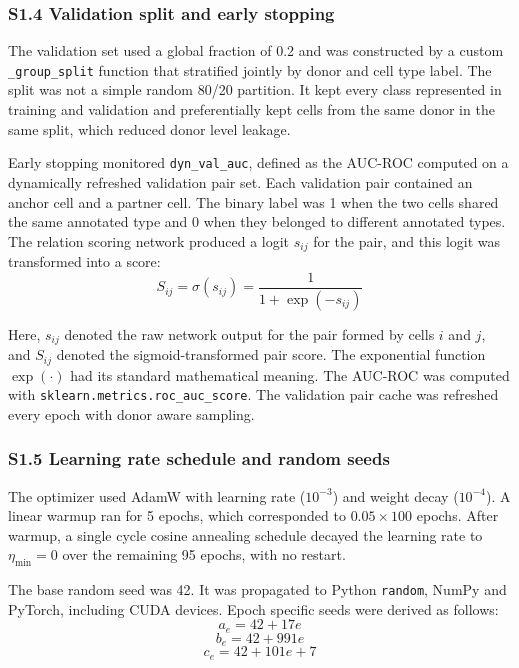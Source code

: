 \documentclass[11pt]{article}
\begin{document}
\subsubsection*{S1.4 Validation split and early stopping}

The validation set used a global fraction of 0.2 and was constructed by a custom \texttt{\_group\_split} function that stratified jointly by donor and cell type label. The split was not a simple random 80/20 partition. It kept every class represented in training and validation and preferentially kept cells from the same donor in the same split, which reduced donor level leakage.

Early stopping monitored \texttt{dyn\_val\_auc}, defined as the AUC-ROC computed on a dynamically refreshed validation pair set. Each validation pair contained an anchor cell and a partner cell. The binary label was 1 when the two cells shared the same annotated type and 0 when they belonged to different annotated types. The relation scoring network produced a logit \(s_{ij}\) for the pair, and this logit was transformed into a score:
\begin{equation}
S_{ij} = \sigma(s_{ij}) = \frac{1}{1+\exp(-s_{ij})}
\label{eq:supp_val_score}
\end{equation}

Here, \(s_{ij}\) denoted the raw network output for the pair formed by cells \(i\) and \(j\), and \(S_{ij}\) denoted the sigmoid-transformed pair score. The exponential function \(\exp(\cdot)\) had its standard mathematical meaning. The AUC-ROC was computed with \texttt{sklearn.metrics.roc\_auc\_score}. The validation pair cache was refreshed every epoch with donor aware sampling.

\subsubsection*{S1.5 Learning rate schedule and random seeds}

The optimizer used AdamW with learning rate (\(10^{-3}\)) and weight decay (\(10^{-4}\)). A linear warmup ran for 5 epochs, which corresponded to \(0.05 \times 100\) epochs. After warmup, a single cycle cosine annealing schedule decayed the learning rate to \(\eta_{\min}=0\) over the remaining 95 epochs, with no restart.

The base random seed was 42. It was propagated to Python \texttt{random}, NumPy and PyTorch, including CUDA devices. Epoch specific seeds were derived as follows:
\begin{equation}
a_e = 42 + 17e
\label{eq:seed_training_pairs}
\end{equation}
\begin{equation}
b_e = 42 + 991e
\label{eq:seed_mixing}
\end{equation}
\begin{equation}
c_e = 42 + 101e + 7
\label{eq:seed_validation}
\end{equation}
\end{document}
